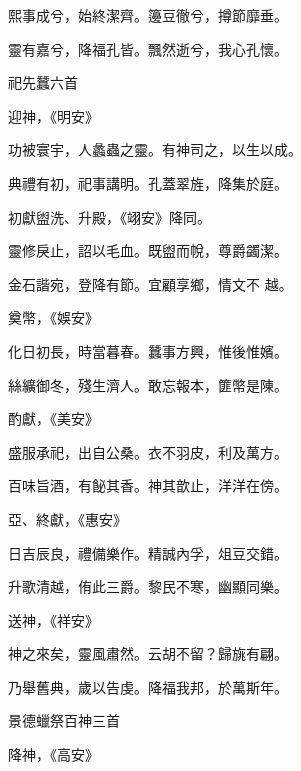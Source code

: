 \begin{pinyinscope}
 熙事成兮，始終潔齊。籩豆徹兮，撙節靡垂。



 靈有嘉兮，降福孔皆。飄然逝兮，我心孔懷。



 祀先蠶六首



 迎神，《明安》



 功被寰宇，人蠡蟲之靈。有神司之，以生以成。



 典禮有初，祀事講明。孔蓋翠旌，降集於庭。



 初獻盥洗、升殿，《翊安》降同。



 靈修戾止，詔以毛血。既盥而帨，尊爵蠲潔。



 金石諧宛，登降有節。宜顧享鄉，情文不
 越。



 奠幣，《娛安》



 化日初長，時當暮春。蠶事方興，惟後惟嬪。



 絲纊御冬，殘生濟人。敢忘報本，篚幣是陳。



 酌獻，《美安》



 盛服承祀，出自公桑。衣不羽皮，利及萬方。



 百味旨酒，有飶其香。神其歆止，洋洋在傍。



 亞、終獻，《惠安》



 日吉辰良，禮備樂作。精誠內孚，俎豆交錯。



 升歌清越，侑此三爵。黎民不寒，幽顯同樂。



 送神，《祥安》



 神之來矣，靈風肅然。云胡不留？歸旐有翩。



 乃舉舊典，歲以告虔。降福我邦，於萬斯年。



 景德蠟祭百神三首



 降神，《高安》




\end{pinyinscope}
